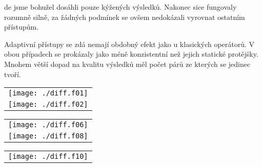 \documentclass[a4paper]{article}
\newenvironment{ukol}[3][]{\begin{trivlist} 
\item[\hskip \labelsep {\bfseries #1}\hskip \labelsep {\bfseries #2}]}{\end{trivlist}}
\begin{document}
\begin{ukol}{Diferenciální operátory}

	Zde jsme bohužel dosáhli pouze kýžených výsledků. Nakonec sice fungovaly rozumně silně, za žádných podmínek se ovšem nedokázali vyrovnat ostatním přístupům.

	Adaptivní přístupy se zdá nemají obdobný efekt jako u klasických operátorů. V obou případech se prokázaly jako méně konzistentní než jejich 
	statické protějšky. Mnohem větší dopad na kvalitu výsledků měl počet párů ze kterých se jedinec tvoří.

	\begin{center}
		\begin{tabular}{ c }
			\texttt{[image: ./diff.f01]} \\ 
			\texttt{[image: ./diff.f02]} \\ 
		\end{tabular}
	\end{center}
	
	\begin{center}
		\begin{tabular}{ c }
			\texttt{[image: ./diff.f06]} \\
			\texttt{[image: ./diff.f08]} \\ 
		\end{tabular}
	\end{center}
	
	\begin{center}
		\begin{tabular}{ c }
			\texttt{[image: ./diff.f10]} \\ 
		\end{tabular}
	\end{center}
\end{ukol}
\end{document}
